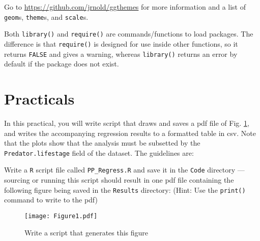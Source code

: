Go to \url{https://github.com/jrnold/ggthemes} for more 
information and a list of {\tt geom}s, {\tt theme}s, and {\tt scale}s. 

\begin{tipbox}
Both {\tt library()} and {\tt require()} are commands/functions to load 
packages. The difference is that {\tt require()} is designed for use 
inside other functions, so it returns {\tt FALSE} and gives a warning, 
whereas {\tt library()} returns an error by default if the package does 
not exist. 
\end{tipbox}

\section{Practicals} \label{sec:PPPrac2}
In this practical, you will write script that draws and saves a pdf 
file of Fig. \ref{PPRegress}, and writes the accompanying 
regression results to a formatted table in csv. Note that the plots 
show that the analysis must be subsetted by the {\tt 
Predator.lifestage} field of the dataset. The guidelines are:

\begin{compactitem}
		
	\item Write a {\tt R} script file called {\tt PP\_Regress.R} and save it in 
	the {\tt Code} directory --- sourcing or running this script should 
	result in one pdf file containing the following figure being 
	saved in the {\tt Results} directory:
	(Hint: Use the {\tt print()} command to write to the pdf)    
\end{compactitem}

\begin{figure}
	\begin{center}
				\texttt{[image: Figure1.pdf]}
	\end{center}
	\caption{Write a script that generates this figure}
	\label{PPRegress}
\end{figure}
	
